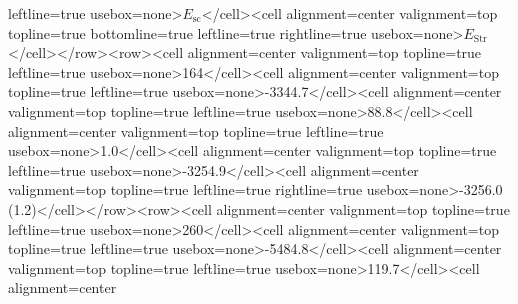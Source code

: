 \begin{table}[H]
leftline=\textquotedbl true\textquotedbl{} usebox=\textquotedbl none\textquotedbl >$E_{\mathrm{sc}}$</cell><cell
alignment=\textquotedbl center\textquotedbl{} valignment=\textquotedbl top\textquotedbl{}
topline=\textquotedbl true\textquotedbl{} bottomline=\textquotedbl true\textquotedbl{}
leftline=\textquotedbl true\textquotedbl{} rightline=\textquotedbl true\textquotedbl{}
usebox=\textquotedbl none\textquotedbl >$E_{\mathrm{Str}}$</cell></row><row><cell
alignment=\textquotedbl center\textquotedbl{} valignment=\textquotedbl top\textquotedbl{}
topline=\textquotedbl true\textquotedbl{} leftline=\textquotedbl true\textquotedbl{}
usebox=\textquotedbl none\textquotedbl >164</cell><cell alignment=\textquotedbl center\textquotedbl{}
valignment=\textquotedbl top\textquotedbl{} topline=\textquotedbl true\textquotedbl{}
leftline=\textquotedbl true\textquotedbl{} usebox=\textquotedbl none\textquotedbl >-3344.7</cell><cell
alignment=\textquotedbl center\textquotedbl{} valignment=\textquotedbl top\textquotedbl{}
topline=\textquotedbl true\textquotedbl{} leftline=\textquotedbl true\textquotedbl{}
usebox=\textquotedbl none\textquotedbl >88.8</cell><cell alignment=\textquotedbl center\textquotedbl{}
valignment=\textquotedbl top\textquotedbl{} topline=\textquotedbl true\textquotedbl{}
leftline=\textquotedbl true\textquotedbl{} usebox=\textquotedbl none\textquotedbl >1.0</cell><cell
alignment=\textquotedbl center\textquotedbl{} valignment=\textquotedbl top\textquotedbl{}
topline=\textquotedbl true\textquotedbl{} leftline=\textquotedbl true\textquotedbl{}
usebox=\textquotedbl none\textquotedbl >-3254.9</cell><cell alignment=\textquotedbl center\textquotedbl{}
valignment=\textquotedbl top\textquotedbl{} topline=\textquotedbl true\textquotedbl{}
leftline=\textquotedbl true\textquotedbl{} rightline=\textquotedbl true\textquotedbl{}
usebox=\textquotedbl none\textquotedbl >-3256.0 (1.2)</cell></row><row><cell
alignment=\textquotedbl center\textquotedbl{} valignment=\textquotedbl top\textquotedbl{}
topline=\textquotedbl true\textquotedbl{} leftline=\textquotedbl true\textquotedbl{}
usebox=\textquotedbl none\textquotedbl >260</cell><cell alignment=\textquotedbl center\textquotedbl{}
valignment=\textquotedbl top\textquotedbl{} topline=\textquotedbl true\textquotedbl{}
leftline=\textquotedbl true\textquotedbl{} usebox=\textquotedbl none\textquotedbl >-5484.8</cell><cell
alignment=\textquotedbl center\textquotedbl{} valignment=\textquotedbl top\textquotedbl{}
topline=\textquotedbl true\textquotedbl{} leftline=\textquotedbl true\textquotedbl{}
usebox=\textquotedbl none\textquotedbl >119.7</cell><cell alignment=\textquotedbl center\textquotedbl{}

\end{table}
